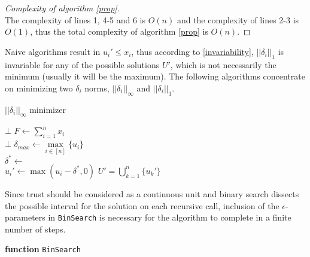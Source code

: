 \documentclass[11pt]{article}
\theoremstyle{definition}
\theoremstyle{corollary}
\theoremstyle{lemma}
\begin{document}
    \begin{proof}[Complexity of algorithm \ref{prop}] \ \\
       The complexity of lines 1, 4-5 and 6 is $O(n)$ and the complexity of lines 2-3 is $O(1)$, thus the total complexity
       of algorithm \ref{prop} is $O(n)$.
    \end{proof}
    Naive algorithms result in $u_i' \leq x_i$, thus according to \ref{invariability}, $||\delta_i||_1$ is invariable for
    any of the possible solutions $U'$, which is not necessarily the minimum (usually it will be the maximum). The following
    algorithms concentrate on minimizing two $\delta_i$ norms, $||\delta_i||_\infty$ and $||\delta_i||_1$. \\
    \begin{algorithm}[H]
       \label{dinf}
       \caption{$||\delta_i||_\infty$ minimizer}
          {\Return $\bot$}
       $F \gets \sum\limits_{i=1}^{n}x_i$ \\
          {\Return $\bot$}
       $\delta_{max} \gets \max\limits_{i \in [n]}\{u_i\}$ \\
       $\delta^* \gets$  \\
          {$u_i' \gets \max{(u_i - \delta^*, 0)}$}
       \Return $U' = \bigcup\limits_{k=1}^{n}\{u_k'\}$
    \end{algorithm}
    Since trust should be considered as a continuous unit and binary search dissects the possible interval for the solution
    on each recursive call, inclusion of the $\epsilon$-parameters in \texttt{BinSearch} is necessary for the algorithm to
    complete in a finite number of steps. \\
    \begin{algorithm}[H]
       \label{binsearch}
       \Output{$\delta^*$}
       \caption*{\textbf{function} \texttt{BinSearch} }
    \end{algorithm}
\end{document}
